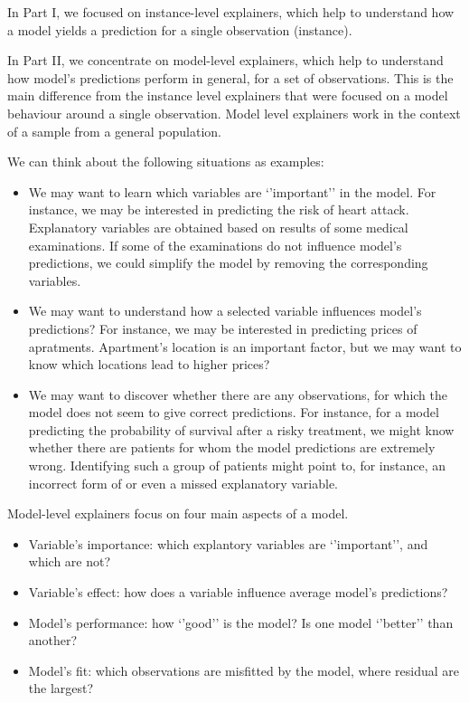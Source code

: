 \documentclass[12pt,]{krantz}
\providecommand{\tightlist}{%
  \setlength{\itemsep}{0pt}\setlength{\parskip}{0pt}}
\begin{document}
In Part I, we focused on instance-level explainers, which help to understand how a model yields a prediction for a single observation (instance).

In Part II, we concentrate on model-level explainers, which help to understand how model's predictions perform in general, for a set of observations. This is the main difference from the instance level explainers that were focused on a model behaviour around a single observation. Model level explainers work in the context of a sample from a general population.

We can think about the following situations as examples:

\begin{itemize}
\tightlist
\item
  We may want to learn which variables are `'important'' in the model. For instance, we may be interested in predicting the risk of heart attack. Explanatory variables are obtained based on results of some medical examinations. If some of the examinations do not influence model's predictions, we could simplify the model by removing the corresponding variables.
\item
  We may want to understand how a selected variable influences model's predictions? For instance, we may be interested in predicting prices of apratments. Apartment's location is an important factor, but we may want to know which locations lead to higher prices?
\item
  We may want to discover whether there are any observations, for which the model does not seem to give correct predictions. For instance, for a model predicting the probability of survival after a risky treatment, we might know whether there are patients for whom the model predictions are extremely wrong. Identifying such a group of patients might point to, for instance, an incorrect form of or even a missed explanatory variable.
\end{itemize}

Model-level explainers focus on four main aspects of a model.

\begin{itemize}
\tightlist
\item
  Variable's importance: which explantory variables are `'important'', and which are not?
\item
  Variable's effect: how does a variable influence average model's predictions?
\item
  Model's performance: how `'good'' is the model? Is one model `'better'' than another?
\item
  Model's fit: which observations are misfitted by the model, where residual are the largest?
\end{itemize}
\end{document}
